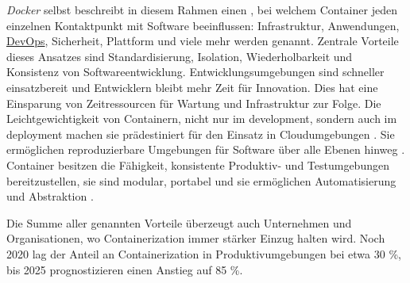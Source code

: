 \textit{Docker} selbst beschreibt in diesem Rahmen einen , bei welchem Container jeden einzelnen Kontaktpunkt mit Software beeinflussen: Infrastruktur, Anwendungen, \hyperref[sec:03-01_introduction-to-devops]{DevOps}, Sicherheit, Plattform und viele mehr werden genannt. Zentrale Vorteile dieses Ansatzes sind Standardisierung, Isolation, Wiederholbarkeit und Konsistenz von Softwareentwicklung. Entwicklungsumgebungen sind schneller einsatzbereit und Entwicklern bleibt mehr Zeit für Innovation. Dies hat eine Einsparung von Zeitressourcen für Wartung und Infrastruktur zur Folge. \cite{016:Effectively-managing-all-of-those-Applications} Die Leichtgewichtigkeit von Containern, nicht nur im \Gls{development}, sondern auch im \Gls{deployment} machen sie prädestiniert für den Einsatz in Cloudumgebungen \cite{015:Containers-in-Software-Development,024:Investiugating-Impact-of-Containerization-on-Deployment-Process-in-DevOps,025:Exploring-Solutions-for-Container-Image-Security}. Sie ermöglichen reproduzierbare Umgebungen für Software über alle Ebenen hinweg \cite{013:Role-of-Containers-in-Reproducibility,024:Investiugating-Impact-of-Containerization-on-Deployment-Process-in-DevOps}. Container besitzen die Fähigkeit, konsistente Produktiv- und Testumgebungen bereitzustellen, sie sind modular, portabel und sie ermöglichen Automatisierung und Abstraktion \cite{014:Managing-Container-based-Software-Development-Environments}.

Die Summe aller genannten Vorteile überzeugt auch Unternehmen und Organisationen, wo Containerization immer stärker Einzug halten wird. Noch 2020 lag der Anteil an Containerization in Produktivumgebungen bei etwa 30 \%, bis 2025 prognostizieren \citeauthor{020:Assessing-and-Improving-Quality-of-Docker-Artifacts} einen Anstieg auf 85 \%. \cite{020:Assessing-and-Improving-Quality-of-Docker-Artifacts}
